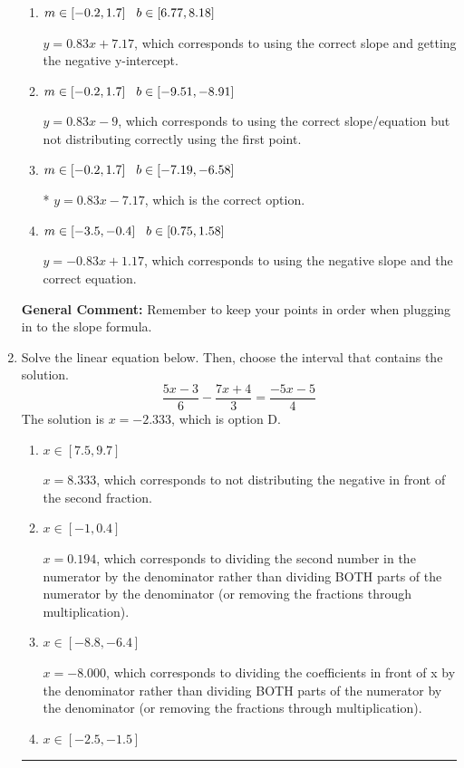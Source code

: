 \documentclass{extbook}[14pt]
\newcommand{\litem}[1]{\item #1

\rule{\textwidth}{0.4pt}}
\begin{document}
\begin{enumerate}
{\begin{enumerate}[label=\Alph*.]
 $y = 0.83x -8$, which corresponds to using the correct slope/equation but not distributing correctly using the second point.
\item \( m \in [-0.2, 1.7] \hspace*{3mm} b \in [6.77, 8.18] \)

 $y = 0.83x + 7.17$, which corresponds to using the correct slope and getting the negative y-intercept.
\item \( m \in [-0.2, 1.7] \hspace*{3mm} b \in [-9.51, -8.91] \)

 $y = 0.83x -9$, which corresponds to using the correct slope/equation but not distributing correctly using the first point.
\item \( m \in [-0.2, 1.7] \hspace*{3mm} b \in [-7.19, -6.58] \)

* $y = 0.83x -7.17$, which is the correct option.
\item \( m \in [-3.5, -0.4] \hspace*{3mm} b \in [0.75, 1.58] \)

 $y = -0.83x + 1.17$, which corresponds to using the negative slope and the correct equation.
\end{enumerate}

\textbf{General Comment:} Remember to keep your points in order when plugging in to the slope formula.
}
\litem{
Solve the linear equation below. Then, choose the interval that contains the solution.
\[ \frac{5x -3}{6} - \frac{7x + 4}{3} = \frac{-5x -5}{4} \]The solution is \( x = -2.333 \), which is option D.\begin{enumerate}[label=\Alph*.]
\item \( x \in [7.5, 9.7] \)

 $x = 8.333$, which corresponds to not distributing the negative in front of the second fraction.
\item \( x \in [-1, 0.4] \)

 $x = 0.194$, which corresponds to dividing the second number in the numerator by the denominator rather than dividing BOTH parts of the numerator by the denominator (or removing the fractions through multiplication).
\item \( x \in [-8.8, -6.4] \)

 $x = -8.000$, which corresponds to dividing the coefficients in front of x by the denominator rather than dividing BOTH parts of the numerator by the denominator (or removing the fractions through multiplication).
\item \( x \in [-2.5, -1.5] \)


\end{enumerate}}
\end{enumerate}
\end{document}
